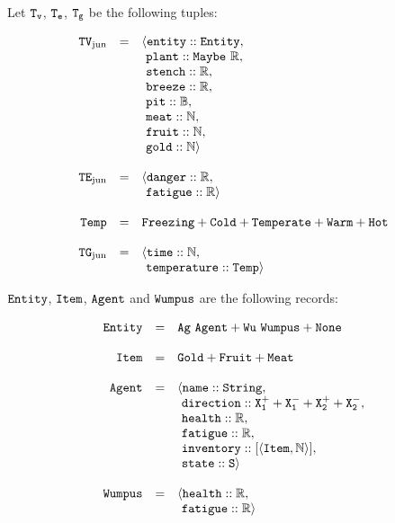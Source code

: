 \begin{definition}[\wjun]
\label{def:wjun}
Let $\mathtt{T_v}$, $\mathtt{T_e}$, $\mathtt{T_g}$ be the following tuples:

$$
	\begin{array}{r c l}
		\type{TV_{\mathrm{jun}}} & = & \langle \field{entity} :: \type{Entity},\\
		           &   & 	   \ \field{plant} :: \type{Maybe\ \R},\\
		           &   &     \ \field{stench} :: \R,\\
		           &   &     \ \field{breeze} :: \R,\\
		           &   &	   \ \field{pit}    :: \B,\\
		           &   &		\ \field{meat}    :: \N,\\
		           &   &		\ \field{fruit}    :: \N,\\
		           &   &	   \ \field{gold}   :: \N \rangle 
		\\
		\\
		\type{TE_{\mathrm{jun}}} & = & \langle \field{danger} :: \R,\\
				   &   &       \ \field{fatigue} :: \R \rangle
		\\
		\\
		\type{Temp} & = & \type{Freezing} + \type{Cold} + \type{Temperate} + \type{Warm} + \type{Hot}\\
		\\
		\type{TG_{\mathrm{jun}}} & = & \langle \field{time} :: \N,\\
				   &   &       \ \field{temperature} :: \type{Temp} \rangle
	\end{array}
$$

$\mathtt{Entity}$, $\mathtt{Item}$, $\mathtt{Agent}$ and $\mathtt{Wumpus}$ are the following records:

$$
	\begin{array}{r c l}
		\mathtt{Entity} & = & \mathtt{Ag\ Agent + Wu\ Wumpus + None}\\
		\\
		\mathtt{Item} & = & \mathtt{Gold + Fruit + Meat}\\
		\\
		\mathtt{Agent} & = & \langle \mathtt{name} :: \mathtt{String},\\ 
					 &   & \ \mathtt{direction} :: \mathtt{X_1^+ + X_1^- + X_2^+ + X_2^-},\\
					 &   & \ \mathtt{health} :: \mathbb{R},\\
					 &   & \ \mathtt{fatigue} :: \mathbb{R},\\
					 &   & \ \mathtt{inventory} :: [\mathtt{\langle Item, \mathbb{N} \rangle}],\\
					 &   & \ \mathtt{state} :: \mathtt{S} \rangle
		\\
		\\
		\mathtt{Wumpus} & = & \langle \mathtt{health} :: \mathbb{R},\\
					  &   & \ \mathtt{fatigue} :: \mathbb{R}\rangle
	\end{array}
$$


\end{definition}
